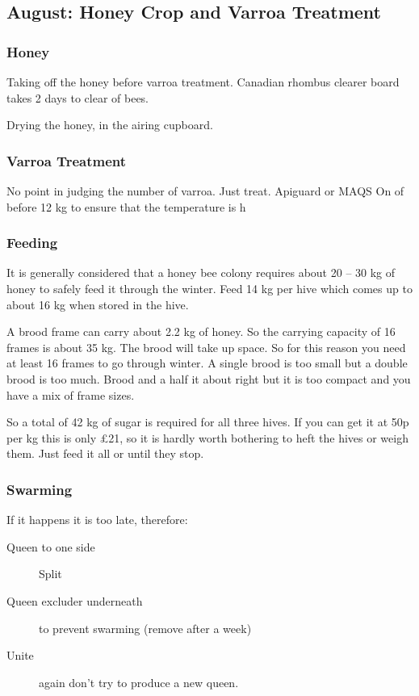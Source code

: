 \subsection{August: Honey Crop and Varroa Treatment}

\subsubsection{Honey}

Taking off the honey before varroa treatment.
Canadian rhombus clearer board takes 2 days to clear of bees.

Drying the honey,
in the airing cupboard.

\subsubsection{Varroa Treatment}

No point in judging the number of varroa.
Just treat.
Apiguard or MAQS
On of before 12 kg to ensure that the temperature is h

\subsubsection{Feeding}

It is
generally considered that a honey bee colony requires about 20 – 30 kg of honey to
safely feed it through the winter. 
Feed 14 kg per hive
which comes up to about 16 kg when stored in the hive.

A brood frame can carry about 2.2 kg of honey.  
So the carrying capacity of 16 frames is about 35 kg.
The brood will take up space.
So for this reason you need at least 16 frames to go through winter.
A single brood is too small but a double brood is too much.
Brood and a half it about right but it is too compact
and you have a mix of frame sizes.

 So a total of 42 kg of sugar is required for all three hives.
 If you can get it at 50p per kg this is only £21,
 so it is hardly worth bothering to heft the hives or weigh them.
 Just feed it all or until they stop.
 
 \subsubsection{Swarming}

 If it happens it is too late, therefore:

 \begin{description}
     \item [Queen to one side] Split
     \item [Queen excluder underneath] to prevent swarming (remove after a week)
     \item [Unite] again don't try to produce a new queen.
 \end{description}
